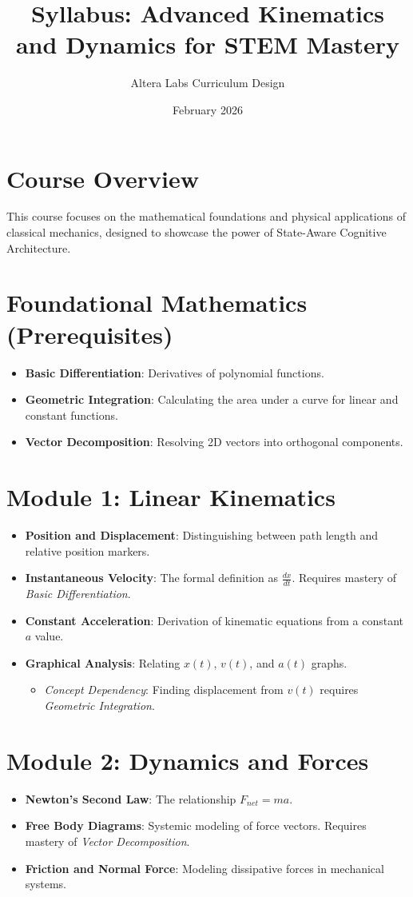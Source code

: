 \documentclass{article}
\title{Syllabus: Advanced Kinematics and Dynamics for STEM Mastery}
\author{Altera Labs Curriculum Design}
\date{February 2026}
\begin{document}
\maketitle

\section{Course Overview}
This course focuses on the mathematical foundations and physical applications of classical mechanics, designed to showcase the power of State-Aware Cognitive Architecture.

\section{Foundational Mathematics (Prerequisites)}
\begin{itemize}
    \item \textbf{Basic Differentiation}: Derivatives of polynomial functions.
    \item \textbf{Geometric Integration}: Calculating the area under a curve for linear and constant functions.
    \item \textbf{Vector Decomposition}: Resolving 2D vectors into orthogonal components.
\end{itemize}

\section{Module 1: Linear Kinematics}
\begin{itemize}
    \item \textbf{Position and Displacement}: Distinguishing between path length and relative position markers.
    \item \textbf{Instantaneous Velocity}: The formal definition as $\frac{dx}{dt}$. Requires mastery of \textit{Basic Differentiation}.
    \item \textbf{Constant Acceleration}: Derivation of kinematic equations from a constant $a$ value.
    \item \textbf{Graphical Analysis}: Relating $x(t)$, $v(t)$, and $a(t)$ graphs.
    \begin{itemize}
        \item \textit{Concept Dependency}: Finding displacement from $v(t)$ requires \textit{Geometric Integration}.
    \end{itemize}
\end{itemize}

\section{Module 2: Dynamics and Forces}
\begin{itemize}
    \item \textbf{Newton's Second Law}: The relationship $F_{net} = ma$.
    \item \textbf{Free Body Diagrams}: Systemic modeling of force vectors. Requires mastery of \textit{Vector Decomposition}.
    \item \textbf{Friction and Normal Force}: Modeling dissipative forces in mechanical systems.
\end{itemize}
\end{document}
